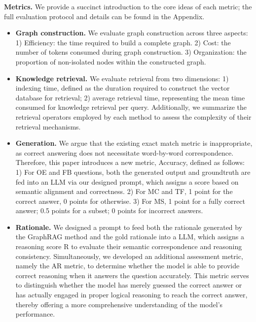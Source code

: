 \documentclass{article}
\begin{document}
\textbf{Metrics.} We provide a succinct introduction to the core ideas of each metric; the full evaluation protocol and details can be found in the Appendix.
\begin{itemize}[leftmargin=*] 
    \item \textbf{Graph construction.} We evaluate graph construction across three aspects: 1) Efficiency: the time required to build a complete graph. 2) Cost: the number of tokens consumed during graph construction. 3) Organization: the proportion of non-isolated nodes within the constructed graph.
    \item \textbf{Knowledge retrieval.} We evaluate retrieval from two dimensions: 1) indexing time, defined as the duration required to construct the vector database for retrieval; 2) average retrieval time, representing the mean time consumed for knowledge retrieval per query. Additionally, we summarize the retrieval operators employed by each method to assess the complexity of their retrieval mechanisms.    
    \item \textbf{Generation.} We argue that the existing exact match metric is inappropriate, as correct answering does not necessitate word-by-word correspondence. Therefore, this paper introduces a new metric, Accuracy, defined as follows: 1) For OE and FB questions, both the generated output and groundtruth are fed into an LLM via our designed prompt, which assigns a score based on semantic alignment and correctness. 2) For MC and TF, 1 point for the correct answer, 0 points for otherwise. 3) For MS, 1 point for a fully correct answer; 0.5 points for a subset; 0 points for incorrect answers.
    \item \textbf{Rationale.} We designed a prompt to feed both the rationale generated by the GraphRAG method and the gold rationale into a LLM, which assigns a reasoning score R to evaluate their semantic correspondence and reasoning consistency. Simultaneously, we developed an additional assessment metric, namely the AR metric, to determine whether the model is able to provide correct reasoning when it answers the question accurately. This metric serves to distinguish whether the model has merely guessed the correct answer or has actually engaged in proper logical reasoning to reach the correct answer, thereby offering a more comprehensive understanding of the model's performance.
\end{itemize}
\end{document}
